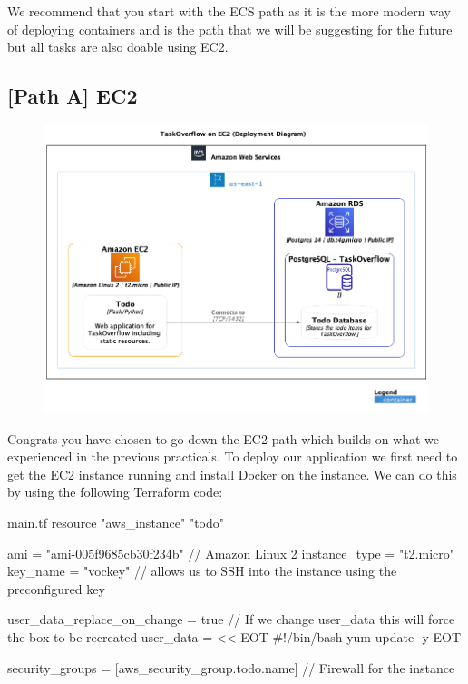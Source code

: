 \documentclass{csse4400}
\begin{document}
We recommend that you start with the ECS path as it is the more modern way of deploying containers and is the path that we will be suggesting for the future but all tasks are also doable using EC2.

\subsection{[Path A] EC2}


\begin{figure}[H]
  \includegraphics[width=\textwidth]{diagrams/ec2deployment}
\end{figure}

Congrats you have chosen to go down the EC2 path which builds on what we experienced in the previous practicals. To deploy our application we first need to get the EC2 instance running and install Docker on the instance. We can do this by using the following Terraform code:

\begin{code}[language=terraform,numbers=none]{main.tf}
  resource "aws_instance" "todo" {
    ami           = "ami-005f9685cb30f234b" // Amazon Linux 2
    instance_type = "t2.micro"
    key_name      = "vockey" // allows us to SSH into the instance using the preconfigured key
    
    user_data_replace_on_change = true // If we change user_data this will force the box to be recreated
    user_data                   = <<-EOT
  #!/bin/bash
  yum update -y
    EOT
  
    security_groups = [aws_security_group.todo.name] // Firewall for the instance
  }
\end{code}
\end{document}
